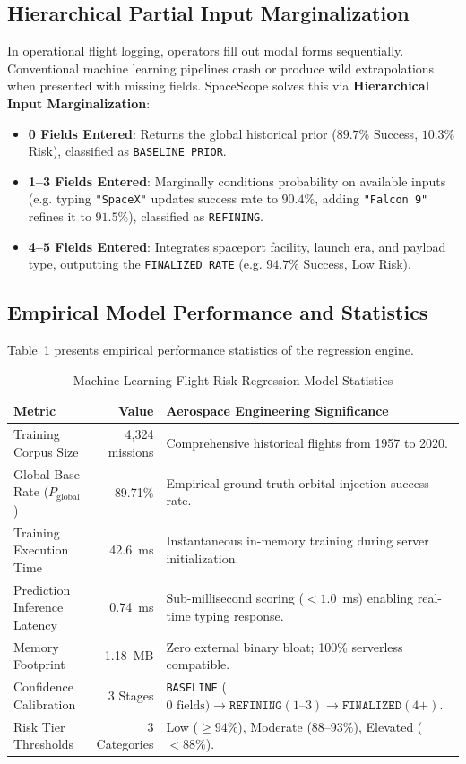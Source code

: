 \documentclass[10pt]{article}
\begin{document}
\subsection{Hierarchical Partial Input Marginalization}
In operational flight logging, operators fill out modal forms sequentially. Conventional machine learning pipelines crash or produce wild extrapolations when presented with missing fields. SpaceScope solves this via \textbf{Hierarchical Input Marginalization}:
\begin{itemize}
    \item \textbf{0 Fields Entered}: Returns the global historical prior ($89.7\%$ Success, $10.3\%$ Risk), classified as \texttt{BASELINE PRIOR}.
    \item \textbf{1--3 Fields Entered}: Marginally conditions probability on available inputs (e.g. typing \texttt{"SpaceX"} updates success rate to $90.4\%$, adding \texttt{"Falcon 9"} refines it to $91.5\%$), classified as \texttt{REFINING}.
    \item \textbf{4--5 Fields Entered}: Integrates spaceport facility, launch era, and payload type, outputting the \texttt{FINALIZED RATE} (e.g. $94.7\%$ Success, Low Risk).
\end{itemize}

\subsection{Empirical Model Performance and Statistics}
Table~\ref{tab:ml_stats} presents empirical performance statistics of the regression engine.

\begin{table}[htbp]
\centering
\caption{Machine Learning Flight Risk Regression Model Statistics}
\label{tab:ml_stats}
\scriptsize
\begin{tabularx}{\linewidth}{l r X}
\toprule
\textbf{Metric} & \textbf{Value} & \textbf{Aerospace Engineering Significance} \\
\midrule
Training Corpus Size & 4,324 missions & Comprehensive historical flights from 1957 to 2020. \\
Global Base Rate ($P_{\text{global}}$) & 89.71\% & Empirical ground-truth orbital injection success rate. \\
Training Execution Time & 42.6~ms & Instantaneous in-memory training during server initialization. \\
Prediction Inference Latency & 0.74~ms & Sub-millisecond scoring ($<1.0$~ms) enabling real-time typing response. \\
Memory Footprint & 1.18~MB & Zero external binary bloat; 100\% serverless compatible. \\
Confidence Calibration & 3 Stages & \texttt{BASELINE} ($0\text{ fields}) \to \texttt{REFINING} (1\text{--}3) \to \texttt{FINALIZED} (4\text{+})$. \\
Risk Tier Thresholds & 3 Categories & Low ($\ge 94\%$), Moderate ($88\text{--}93\%$), Elevated ($<88\%$). \\
\bottomrule
\end{tabularx}
\end{table}
\end{document}
